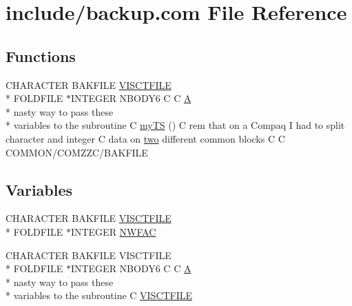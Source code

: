 \hypertarget{home_2abonfi_2_c_f_d__codes_2_eul_f_s_83_84_2include_2backup_8com}{\section{include/backup.com File Reference}
\label{home_2abonfi_2_c_f_d__codes_2_eul_f_s_83_84_2include_2backup_8com}
}
\subsection*{Functions}
\begin{DoxyCompactItemize}
\item 
C\-H\-A\-R\-A\-C\-T\-E\-R B\-A\-K\-F\-I\-L\-E \hyperlink{msa20_2home_2abonfi_2_c_f_d__codes_2_eul_f_s_83_82_83_2include_2backup_8com_a95c1296e8e0de833d5ad9c330b97f734}{V\-I\-S\-C\-T\-F\-I\-L\-E} \\*
F\-O\-L\-D\-F\-I\-L\-E $\ast$I\-N\-T\-E\-G\-E\-R N\-B\-O\-D\-Y6 C C \hyperlink{msa20_2home_2abonfi_2_c_f_d__codes_2_eul_f_s_83_82_83_2include_2ibc2_8com_ad2108d58343608772fff791c23da58f5}{A} \\*
nasty way to pass these \\*
variables to the subroutine C \hyperlink{home_2abonfi_2_c_f_d__codes_2_eul_f_s_83_84_2include_2backup_8com_a11cd648710b4262037820f234b3c55d7}{my\-T\-S} () C rem that on a Compaq I had to split character and integer C data on \hyperlink{msa20_2home_2abonfi_2_c_f_d__codes_2_eul_f_s_83_82_83_2include_2time_8com_af6fa394ac00f173f45ace38681d2e1a4}{two} different common blocks C C C\-O\-M\-M\-O\-N/C\-O\-M\-Z\-Z\-C/B\-A\-K\-F\-I\-L\-E
\end{DoxyCompactItemize}
\subsection*{Variables}
\begin{DoxyCompactItemize}
\item 
C\-H\-A\-R\-A\-C\-T\-E\-R B\-A\-K\-F\-I\-L\-E \hyperlink{msa20_2home_2abonfi_2_c_f_d__codes_2_eul_f_s_83_82_83_2include_2backup_8com_a95c1296e8e0de833d5ad9c330b97f734}{V\-I\-S\-C\-T\-F\-I\-L\-E} \\*
F\-O\-L\-D\-F\-I\-L\-E $\ast$I\-N\-T\-E\-G\-E\-R \hyperlink{home_2abonfi_2_c_f_d__codes_2_eul_f_s_83_84_2include_2backup_8com_ae75931775f64e441b9b188902adc3ac4}{N\-W\-F\-A\-C}
\item 
C\-H\-A\-R\-A\-C\-T\-E\-R B\-A\-K\-F\-I\-L\-E V\-I\-S\-C\-T\-F\-I\-L\-E \\*
F\-O\-L\-D\-F\-I\-L\-E $\ast$I\-N\-T\-E\-G\-E\-R N\-B\-O\-D\-Y6 C C \hyperlink{msa20_2home_2abonfi_2_c_f_d__codes_2_eul_f_s_83_82_83_2include_2ibc2_8com_ad2108d58343608772fff791c23da58f5}{A} \\*
nasty way to pass these \\*
variables to the subroutine C \hyperlink{home_2abonfi_2_c_f_d__codes_2_eul_f_s_83_84_2include_2backup_8com_a95c1296e8e0de833d5ad9c330b97f734}{V\-I\-S\-C\-T\-F\-I\-L\-E}
\end{DoxyCompactItemize}



